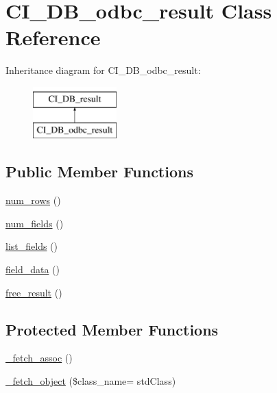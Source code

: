 \hypertarget{class_c_i___d_b__odbc__result}{}\section{C\+I\+\_\+\+D\+B\+\_\+odbc\+\_\+result Class Reference}
\label{class_c_i___d_b__odbc__result}
Inheritance diagram for C\+I\+\_\+\+D\+B\+\_\+odbc\+\_\+result\+:\begin{figure}[H]
\begin{center}
\leavevmode
\includegraphics[height=2.000000cm]{class_c_i___d_b__odbc__result}
\end{center}
\end{figure}
\subsection*{Public Member Functions}
\begin{DoxyCompactItemize}
\item 
\hyperlink{class_c_i___d_b__odbc__result_a218657c303ee499b97710ab0cd2f5d6e}{num\+\_\+rows} ()
\item 
\hyperlink{class_c_i___d_b__odbc__result_af831bf363e4d7d661a717a4932af449d}{num\+\_\+fields} ()
\item 
\hyperlink{class_c_i___d_b__odbc__result_a50b54eb4ea7cfd039740f532988ea776}{list\+\_\+fields} ()
\item 
\hyperlink{class_c_i___d_b__odbc__result_a84bffd65e53902ade1591716749a33e3}{field\+\_\+data} ()
\item 
\hyperlink{class_c_i___d_b__odbc__result_aad2d98d6beb3d6095405356c6107b473}{free\+\_\+result} ()
\end{DoxyCompactItemize}
\subsection*{Protected Member Functions}
\begin{DoxyCompactItemize}
\item 
\hyperlink{class_c_i___d_b__odbc__result_a43a9a92817f1334a1c10752ec44275a0}{\+\_\+fetch\+\_\+assoc} ()
\item 
\hyperlink{class_c_i___d_b__odbc__result_ac0acae0a13c8bfe4c34198813ecf43a0}{\+\_\+fetch\+\_\+object} (\$class\+\_\+name= \textquotesingle{}std\+Class\textquotesingle{})
\end{DoxyCompactItemize}
